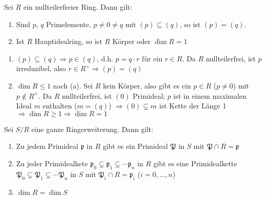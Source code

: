 \begin{Bem}
\label{2.25}
Sei $R$ ein nullteilerfreier Ring. Dann gilt: 
\begin{enumerate}
\item Sind $p$, $q$ Primelemente, $p\neq 0\neq q$ mit $(p)\subseteq (q)$, so ist
$(p)=(q)$.
\item Ist $R$ Hauptidealring, so ist $R$ K\"orper oder $\dim{R}=1$
\end{enumerate}
\end{Bem}
\begin{Bew}
\begin{enumerate}

\item $(p)\subseteq (q)\Rightarrow p\in(q)$, d.h. $p=q\cdot r$ f\"ur ein $r\in R$.
Da $R$ nullteilerfrei, ist $p$ irreduzibel, also $r\in R^{\times}\Rightarrow (p)=(q)$

\item $\dim{R}\leq 1$ nach (a). Sei $R$ kein K\"orper, also gibt es ein $p\in R$ 
($p\neq 0$) mit $p\notin R^{\times}$. Da $R$ nullteilerfrei, ist $(0)$ Primideal;
$p$ ist in einem maximalen Ideal $m$ enthalten ($m=(q)$)
$\Rightarrow (0)\subsetneq m$ ist Kette der L\"ange 1
$\Rightarrow \dim{R}\geq 1 \Rightarrow \dim{R}=1$

\end{enumerate}
\end{Bew}

\begin{Satz}
\label{Satz10}
Sei $S/R$ eine ganze Ringerweiterung. Dann gilt:
\begin{enumerate}

\item Zu jedem Primideal $\mathfrak{p}$ in $R$ gibt es ein Primideal $\mathfrak{P}$ in $S$
mit $\mathfrak{P}\cap R=\mathfrak{p}$

\item Zu jeder Primidealkete $\mathfrak{p}_0\subsetneq \mathfrak{p}_1\subsetneq \cdots
\mathfrak{p}_n$ in $R$ gibt es eine Primidealkette 
$\mathfrak{P}_0\subsetneq \mathfrak{P}_1\subsetneq \cdots \mathfrak{P}_n$ in $S$
mit $\mathfrak{P}_i\cap R=\mathfrak{p}_i$ ($i=0,\ldots, n$)

\item \label{Satz10c}$\dim{R}= \dim{S}$

\end{enumerate}
\end{Satz}

